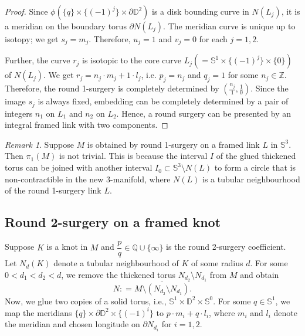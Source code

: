\documentclass{amsart}
\theoremstyle{plain}
\newtheorem{lem}{Lemma}
\theoremstyle{remark}
\newtheorem{rem}{Remark}
\theoremstyle{definition}
\newcommand{\s}{\mathbb{S}}
\newcommand{\D}{\mathbb{D}}
\begin{document}
\begin{proof}
Since $\phi(\{q\} \times \{(-1)^j\} \times \partial \D^2)$ is a disk bounding curve in $N(L_j)$, it is a meridian on the boundary torus $\partial N(L_j)$.
The meridian curve is unique up to isotopy; we get $s_{j} = m_{j}$.
Therefore, $u_{j}= 1$ and $ v_{j}= 0$ for each $j=1,2$. 

Further, the curve $r_{j}$ is isotopic to the core curve $L_j (=\s^1 \times \{(-1)^j\} \times \{0\})$ of $N(L_j)$. 
We get $ r_{j} =  n_{j} \cdot m_{j} + 1 \cdot l_{j}$, i.e. $p_{j}=n_{j}$ and $q_{j}=1$ for some $n_j \in \mathbb{Z}$. 
Therefore, the round 1-surgery is completely determined by $(\frac{n_j}{1}, \frac{1}{0})$.
Since the image $s_j$ is always fixed, embedding can be completely determined by a pair of integers $n_1$ on $L_1$ and $n_2$ on $L_2$. 
Hence, a round surgery can be presented by an integral framed link with two components. 
\end{proof} 


\begin{rem}
Suppose $M$ is obtained by round 1-surgery on a framed link $L$ in $\s^3$. 
Then $\pi_1(M)$ is not trivial. 
This is because the interval $I$ of the glued thickened torus can be joined with another interval $I_0\subset \s^3\setminus N(L)$ to form a circle that is non-contractible in the new 3-manifold, where $N(L)$ is a tubular neighbourhood of the round 1-surgery link $L$.
\end{rem}






 
\subsection{Round 2-surgery on a framed knot}
Suppose $K$ is a knot in $M$ and $\dfrac{p}{q}\in \mathbb{Q}\cup \{\infty\}$ is the round 2-surgery coefficient. 
Let $N_d(K)$ denote a tubular neighbourhood of $K$ of some radius $d$. 
For some $0<d_1 < d_2 < d$, we remove the thickened torus $N_{d_2} \setminus N_{d_1}$ from $M$ and obtain
$$N : = \overline{M \setminus \left(N_{d_2} \setminus N_{d_1}\right)}.$$
Now, we glue two copies of a solid torus, i.e., $\s^1 \times \D^2 \times \s^0$. 
For some $q \in \s^1$, we map the meridians $\{q\}\times \partial \D^2 \times \{(-1)^i\}$ to $p \cdot m_i + q \cdot l_i$, where $m_i$ and $l_i$ denote the meridian and chosen longitude on $\partial N_{d_i}$ for $i=1,2$.
\end{document}
